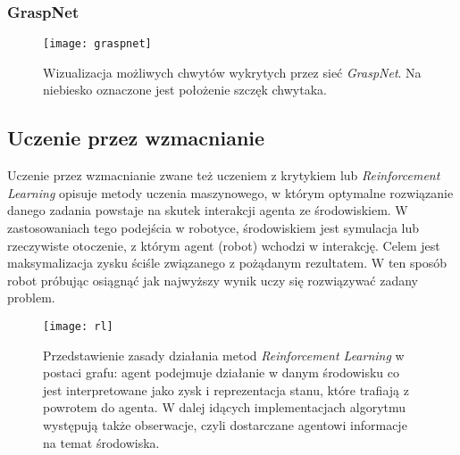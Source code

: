 \documentclass[12pt]{article}
\begin{document}
\subsubsection{GraspNet}

\begin{figure}[h]
\centering
\texttt{[image: graspnet]}
\caption{Wizualizacja możliwych chwytów wykrytych przez sieć \emph{GraspNet}. Na niebiesko oznaczone jest położenie szczęk chwytaka.}
\end{figure}

\subsection{Uczenie przez wzmacnianie}
Uczenie przez wzmacnianie zwane też uczeniem z krytykiem lub \emph{Reinforcement Learning} opisuje metody uczenia maszynowego, w którym optymalne rozwiązanie danego zadania powstaje na skutek interakcji agenta ze środowiskiem. W zastosowaniach tego podejścia w robotyce, środowiskiem jest symulacja lub rzeczywiste otoczenie, z którym agent (robot) wchodzi w interakcję. Celem jest maksymalizacja zysku ściśle związanego z pożądanym rezultatem. W ten sposób robot próbując osiągnąć jak najwyższy wynik uczy się rozwiązywać zadany problem.

\begin{figure}[h]
\centering
\texttt{[image: rl]}
\caption{Przedstawienie zasady działania metod \emph{Reinforcement Learning} w postaci grafu: agent podejmuje działanie w danym środowisku co jest interpretowane jako zysk i reprezentacja stanu, które trafiają z powrotem do agenta. W dalej idących implementacjach algorytmu występują także obserwacje, czyli dostarczane agentowi informacje na temat środowiska.}
\end{figure}
\end{document}
